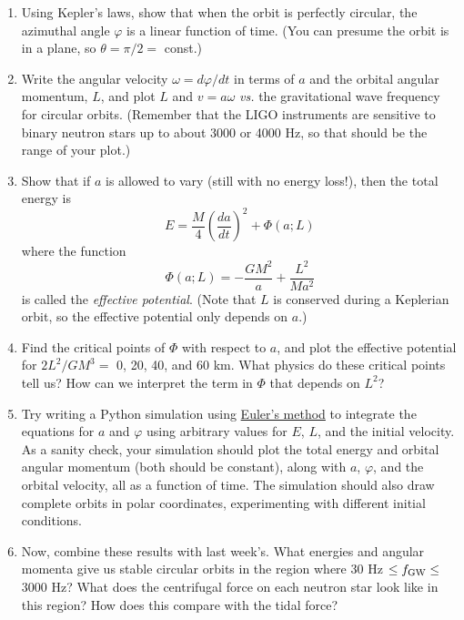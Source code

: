 \documentclass[11pt]{article}
\begin{document}
\begin{enumerate}

\item Using Kepler's laws, show that when the orbit is perfectly circular, the azimuthal angle $\varphi$ is a linear function of time. (You can presume the orbit is in a plane, so $\theta = \pi/2 =$ const.)

\item Write the angular velocity $\omega = d\varphi/dt$ in terms of $a$ and the orbital angular momentum, $L$, and plot $L$ and $v=a\omega$ \textit{vs.} the gravitational wave frequency for circular orbits. (Remember that the LIGO instruments are sensitive to binary neutron stars up to about 3000 or 4000 Hz, so that should be the range of your plot.)

\item Show that if $a$ is allowed to vary (still with no energy loss!), then the total energy is
\begin{equation}
E = \frac{M}{4}\left(\frac{da}{dt}\right)^2 + \Phi(a; L)
\end{equation}
where the function
\begin{equation}\label{eq:effective_potential}
\Phi(a; L) = - \frac{GM^2}{a} + \frac{L^2}{Ma^2}
\end{equation}
is called the \textit{effective potential}. (Note that $L$ is conserved during a Keplerian orbit, so the effective potential only depends on $a$.)

\item Find the critical points of $\Phi$ with respect to $a$, and plot the effective potential for $2L^2/GM^3 =$ 0, 20, 40, and 60 km. What physics do these critical points tell us? How can we interpret the term in $\Phi$ that depends on $L^2$?

\item Try writing a Python simulation using \href{https://en.wikipedia.org/wiki/Euler_method}{Euler's method} to integrate the equations for $a$ and $\varphi$ using arbitrary values for $E$, $L$, and the initial velocity. As a sanity check, your simulation should plot the total energy and orbital angular momentum (both should be constant), along with $a$, $\varphi$, and the orbital velocity, all as a function of time. The simulation should also draw complete orbits in polar coordinates, experimenting with different initial conditions.

\item Now, combine these results with last week's. What energies and angular momenta give us stable circular orbits in the region where 30 Hz $\leq f_{\rm GW} \leq$ 3000 Hz? What does the centrifugal force on each neutron star look like in this region? How does this compare with the tidal force?

\end{enumerate}
\end{document}
